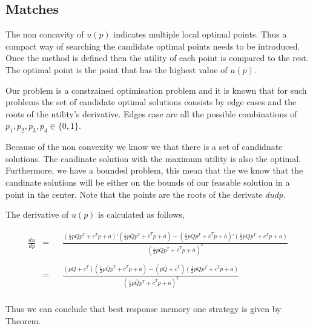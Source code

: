 \documentclass[10pt]{article}
\begin{document}
\subsection{Matches}

The non concavity of \(u(p)\) indicates multiple local optimal points. Thus a
compact way of searching the candidate optimal points needs to be introduced.
Once the method is defined then the utility of each point is compared to the
rest. The optimal point is the point that has the highest value of \(u(p)\).

Our problem is a constrained optimisation problem and it is known that for such
problems the set of candidate optimal solutions consists by edge cases and the roots
of the utility's derivative. Edges case are all the possible combinations of
\(p_1, p_2, p_3, p_4 \in \{0, 1\}\).

Because of the non convexity we know we that there is a set of candidnate solutions.
The candinate solution with the maximum utility is also the optimal. Furthermore,
we have a bounded problem, this mean that the we know that the candinate solutions
will be either on the bounds of our feasable solution in a point in the center.
Note that the points are the roots of the derivate ${du}{dp}$.

The derivative of \(u(p)\) is calculated as follows,

\begin{equation}\label{eq:derivative_of_quadratic}
    \begin{aligned}
     \frac{du}{dp} & = && \frac{(  \frac{1}{2}p  Q  p^T + c^T p + a)'
      (  \frac{1}{2} p  \bar{Q}  p^T + \bar{c}^T  p + \bar{a}) - 
      (  \frac{1}{2} p  \bar{Q}  p^T + \bar{c}^T  p + \bar{a})'
      (  \frac{1}{2} p  Q  p^T + c^T p + a)}
      {(  \frac{1}{2} p  \bar{Q}  p^T + \bar{c}^T  p + \bar{a})^2} \\
      \\
    & = && \frac{(pQ + c^T) ( \frac{1}{2} p  \bar{Q}  p^T + \bar{c}^T  p + \bar{a}) 
    - (p\bar{Q} + \bar{c}^T)( \frac{1}{2} p  Q  p^T + c^T p + a)}
      {( \frac{1}{2} p  \bar{Q}  p^T + \bar{c}^T  p + \bar{a})^2} \\
    \end{aligned}
\end{equation}

Thus we can conclude that best response memory one strategy is given by Theorem.
\end{document}

